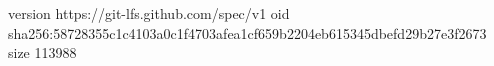 version https://git-lfs.github.com/spec/v1
oid sha256:58728355c1c4103a0c1f4703afea1cf659b2204eb615345dbefd29b27e3f2673
size 113988
